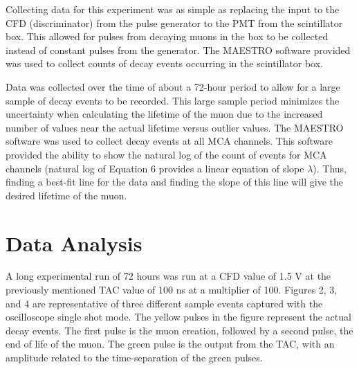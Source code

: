 \documentclass[%
 aip,
 amsmath,amssymb,
 reprint,%
floatfix,
]{revtex4-1}
\begin{document}
Collecting data for this experiment was as simple as replacing the input to the CFD (discriminator) from the pulse generator to the PMT from the scintillator box. This allowed for pulses from decaying muons in the box to be collected instead of constant pulses from the generator. The MAESTRO software provided was used to collect counts of decay events occurring in the scintillator box.

Data was collected over the time of about a 72-hour period to allow for a large sample of decay events to be recorded. This large sample period minimizes the uncertainty when calculating the lifetime of the muon due to the increased number of values near the actual lifetime versus outlier values. The MAESTRO software was used to collect decay events at all MCA channels. This software provided the ability to show the natural log of the count of events for MCA channels (natural log of Equation 6 provides a linear equation of slope $\lambda$). Thus, finding a best-fit line for the data and finding the slope of this line will give the desired lifetime of the muon.

\section{\label{sec:level4}Data Analysis}

A long experimental run of 72 hours was run at a CFD value of 1.5 V at the previously mentioned TAC value of 100 ns at a multiplier of 100. Figures 2, 3, and 4 are representative of three different sample events captured with the oscilloscope single shot mode. The yellow pulses in the figure represent the actual decay events. The first pulse is the muon creation, followed by a second pulse, the end of life of the muon. The green pulse is the output from the TAC, with an amplitude related to the time-separation of the green pulses.
\end{document}
